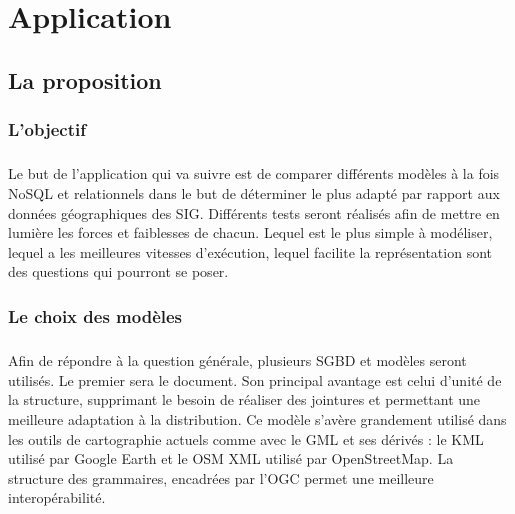 \chapter{Application}
\section{La proposition}
\subsection{L'objectif}
\paragraph{}Le but de l'application qui va suivre est de comparer différents modèles à la fois NoSQL et relationnels dans le but de déterminer le plus adapté par rapport aux données géographiques des SIG. Différents tests seront réalisés afin de mettre en lumière les forces et faiblesses de chacun. Lequel est le plus simple à modéliser, lequel a les meilleures vitesses d'exécution, lequel facilite la représentation sont des questions qui pourront se poser.


\subsection{Le choix des modèles}
\paragraph{}Afin de répondre à la question générale, plusieurs SGBD et modèles seront utilisés. Le premier sera le document. Son principal avantage est celui d'unité de la structure, supprimant le besoin de réaliser des jointures et permettant une meilleure adaptation à la distribution. Ce modèle s'avère grandement utilisé dans les outils de cartographie actuels comme avec le  \acrshort{GML} et ses dérivés : le  \acrshort{KML} utilisé par Google Earth et le OSM XML utilisé par OpenStreetMap. La structure des grammaires, encadrées par l'\acrfull{OGC} permet une meilleure interopérabilité.


